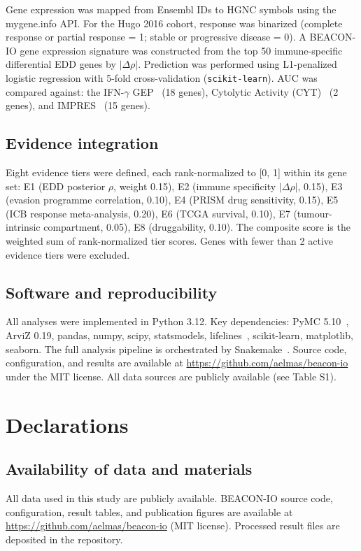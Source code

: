 \documentclass[12pt]{article}
\begin{document}
Gene expression was mapped from Ensembl IDs to HGNC symbols using the mygene.info API. For the Hugo 2016 cohort, response was binarized (complete response or partial response = 1; stable or progressive disease = 0). A BEACON-IO gene expression signature was constructed from the top 50 immune-specific differential EDD genes by $|\Delta\rho|$. Prediction was performed using L1-penalized logistic regression with 5-fold cross-validation (\texttt{scikit-learn}). AUC was compared against: the IFN-$\gamma$ GEP~\citep{Ayers2017} (18 genes), Cytolytic Activity (CYT)~\citep{Rooney2015} (2 genes), and IMPRES~\citep{Auslander2018} (15 genes).

\subsection*{Evidence integration}

Eight evidence tiers were defined, each rank-normalized to [0, 1] within its gene set: E1 (EDD posterior $\rho$, weight 0.15), E2 (immune specificity $|\Delta\rho|$, 0.15), E3 (evasion programme correlation, 0.10), E4 (PRISM drug sensitivity, 0.15), E5 (ICB response meta-analysis, 0.20), E6 (TCGA survival, 0.10), E7 (tumour-intrinsic compartment, 0.05), E8 (druggability, 0.10). The composite score is the weighted sum of rank-normalized tier scores. Genes with fewer than 2 active evidence tiers were excluded.

\subsection*{Software and reproducibility}

All analyses were implemented in Python 3.12. Key dependencies: PyMC 5.10~\citep{Salvatier2016}, ArviZ 0.19, pandas, numpy, scipy, statsmodels, lifelines~\citep{Davidson-Pilon2019}, scikit-learn, matplotlib, seaborn. The full analysis pipeline is orchestrated by Snakemake~\citep{Molder2021}. Source code, configuration, and results are available at \url{https://github.com/aelmas/beacon-io} under the MIT license. All data sources are publicly available (see Table S1).

\section*{Declarations}

\subsection*{Availability of data and materials}
All data used in this study are publicly available. BEACON-IO source code, configuration, result tables, and publication figures are available at \url{https://github.com/aelmas/beacon-io} (MIT license). Processed result files are deposited in the repository.
\end{document}
